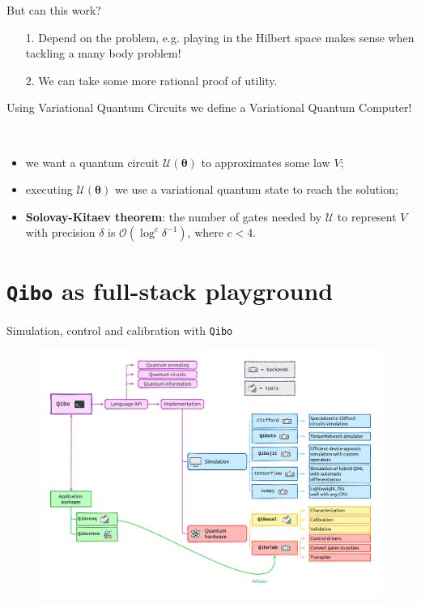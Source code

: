 \documentclass[8pt, xcolor={svgnames}, hyperref={linkcolor=black}]{beamer}
\begin{document}
\begin{frame}{But can this work?}
\pause
\begin{itemize}[noitemsep]
\item[1.] Depend on the problem\pause, e.g. playing in the Hilbert space 
makes sense when tackling a many body problem!
\pause
\item[2.] We can take some more rational proof of utility.
\end{itemize}
\pause
Using Variational Quantum Circuits we define a Variational Quantum Computer!
\pause
\begin{multicols}{2}
\texttt{\\}
\begin{itemize}
\item<7,8,9>[1.] we want a quantum circuit $\mathcal{U}(\bm{\theta})$ to approximates some law $V$;
\item<8,9>[2.] executing $\mathcal{U}(\bm{\theta})$ we use a variational quantum state
to reach the solution;
\item<9>[3.] \textbf{Solovay-Kitaev theorem}: the number of gates needed by $\mathcal{U}$ to 
represent $V$ with precision $\delta$ is $\mathcal{O}(\log^c \delta^{-1})$, where
$c<4$.
\end{itemize}
\begin{figure}
\end{figure}
\end{multicols}
\end{frame}

\section{\texttt{Qibo} as full-stack playground}

\begin{frame}{Simulation, control and calibration with \texttt{Qibo}}
\pause
\begin{figure}
   \includegraphics[width=1\textwidth]{figures/qibo_ecosystem_webpage.pdf}
\end{figure}
\end{frame}
\end{document}
